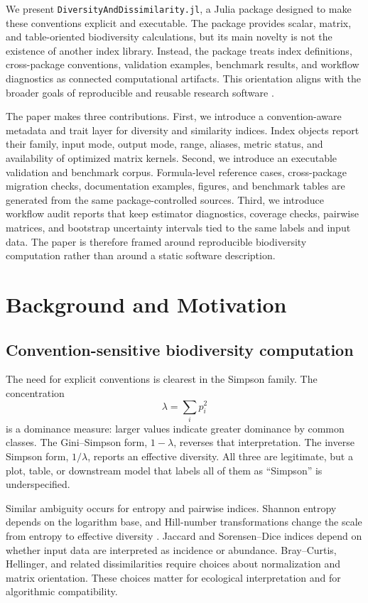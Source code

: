 \documentclass[preprint,12pt,authoryear]{elsarticle}
\begin{document}
We present \texttt{DiversityAndDissimilarity.jl}, a Julia package designed to make
these conventions explicit and executable.  The package provides scalar,
matrix, and table-oriented biodiversity calculations, but its main novelty is
not the existence of another index library.  Instead, the package treats
index definitions, cross-package conventions, validation examples, benchmark
results, and workflow diagnostics as connected computational artifacts.
This orientation aligns with the broader goals of reproducible and reusable
research software \citep{peng2011reproducible,wilkinson2016fair}.

The paper makes three contributions.  First, we introduce a convention-aware
metadata and trait layer for diversity and similarity indices.  Index objects
report their family, input mode, output mode, range, aliases, metric status,
and availability of optimized matrix kernels.  Second, we introduce an
executable validation and benchmark corpus.  Formula-level reference cases,
cross-package migration checks, documentation examples, figures, and
benchmark tables are generated from the same package-controlled sources.
Third, we introduce workflow audit reports that keep estimator diagnostics,
coverage checks, pairwise matrices, and bootstrap uncertainty intervals tied
to the same labels and input data.  The paper is therefore framed around
reproducible biodiversity computation rather than around a static software
description.

\section{Background and Motivation}

\subsection{Convention-sensitive biodiversity computation}

The need for explicit conventions is clearest in the Simpson family.  The
concentration
\[
  \lambda = \sum_i p_i^2
\]
is a dominance measure: larger values indicate greater dominance by common
classes.  The Gini--Simpson form, \(1-\lambda\), reverses that interpretation.
The inverse Simpson form, \(1/\lambda\), reports an effective diversity.  All
three are legitimate, but a plot, table, or downstream model that labels all
of them as ``Simpson'' is underspecified.

Similar ambiguity occurs for entropy and pairwise indices.  Shannon entropy
depends on the logarithm base, and Hill-number transformations change the
scale from entropy to effective diversity \citep{hill1973diversity,
jost2006entropy}.  Jaccard and Sorensen--Dice indices depend on whether input
data are interpreted as incidence or abundance.  Bray--Curtis, Hellinger, and
related dissimilarities require choices about normalization and matrix
orientation.  These choices matter for ecological interpretation and for
algorithmic compatibility.
\end{document}
